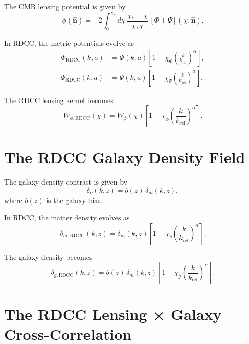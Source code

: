 \documentclass[11pt,a4paper]{article}
\begin{document}
The CMB lensing potential is given by
\begin{equation}
    \phi(\hat{\mathbf{n}})
    = -2 \int_{0}^{\chi_{*}}
      d\chi\,
      \frac{\chi_{*} - \chi}{\chi_{*}\chi}\,
      \left[\Phi + \Psi\right](\chi,\hat{\mathbf{n}}).
\end{equation}

In RDCC, the metric potentials evolve as
\begin{align}
    \Phi_{\mathrm{RDCC}}(k,a)
    &= \Phi(k,a)
       \left[
         1 - \chi_{\Phi}
         \left(\frac{k}{k_{\mathrm{rel}}}\right)^{\alpha}
       \right], \\
    \Psi_{\mathrm{RDCC}}(k,a)
    &= \Psi(k,a)
       \left[
         1 - \chi_{\Psi}
         \left(\frac{k}{k_{\mathrm{rel}}}\right)^{\alpha}
       \right].
\end{align}

The RDCC lensing kernel becomes
\begin{equation}
    W_{\phi,\mathrm{RDCC}}(\chi)
    = W_{\phi}(\chi)
      \left[
        1 - \chi_{\phi}
        \left(\frac{k}{k_{\mathrm{rel}}}\right)^{\alpha}
      \right].
\end{equation}
\section{The RDCC Galaxy Density Field}

The galaxy density contrast is given by
\begin{equation}
    \delta_{g}(k,z)
    = b(z)\, \delta_{m}(k,z),
\end{equation}
where $b(z)$ is the galaxy bias.

In RDCC, the matter density evolves as
\begin{equation}
    \delta_{m,\mathrm{RDCC}}(k,z)
    = \delta_{m}(k,z)
      \left[
        1 - \chi_{\delta}
        \left(\frac{k}{k_{\mathrm{rel}}}\right)^{\alpha}
      \right].
\end{equation}

The galaxy density becomes
\begin{equation}
    \delta_{g,\mathrm{RDCC}}(k,z)
    = b(z)\,
      \delta_{m}(k,z)
      \left[
        1 - \chi_{g}
        \left(\frac{k}{k_{\mathrm{rel}}}\right)^{\alpha}
      \right].
\end{equation}
\section{The RDCC Lensing × Galaxy Cross-Correlation}
\end{document}
